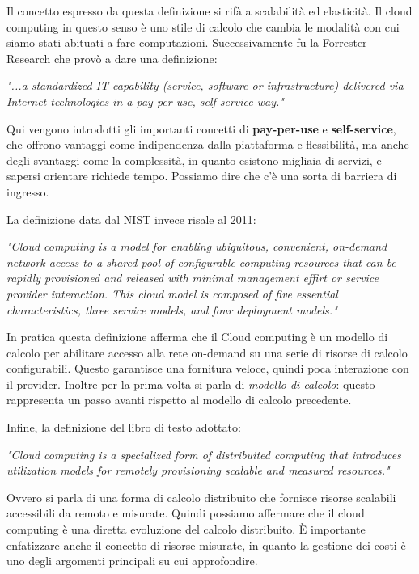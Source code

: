 Il concetto espresso da questa definizione si rifà a scalabilità ed elasticità. Il cloud computing in questo senso è uno stile di calcolo che cambia le modalità con cui siamo stati abituati a fare computazioni.
Successivamente fu la Forrester Research che provò a dare una definizione:
\begin{displayquote}
\textit{"...a standardized IT capability (service, software or infrastructure) delivered via Internet technologies in a pay-per-use, self-service way."}
\end{displayquote}
Qui vengono introdotti gli importanti concetti di \textbf{pay-per-use} e \textbf{self-service}, che offrono vantaggi come indipendenza dalla piattaforma e flessibilità, ma anche degli svantaggi come la complessità, in quanto esistono migliaia di servizi, e sapersi orientare richiede tempo. Possiamo dire che c'è una sorta di barriera di ingresso.

\vspace{5mm}

La definizione data dal NIST invece risale al 2011:
\begin{displayquote}
\textit{"Cloud computing is a model for enabling ubiquitous, convenient, on-demand network access to a shared pool of configurable computing resources that can be rapidly provisioned and released with minimal management effirt or service provider interaction. This cloud model is composed of five essential characteristics, three service models, and four deployment models."}
\end{displayquote}
In pratica questa definizione afferma che il Cloud computing è un modello di calcolo per abilitare accesso alla rete on-demand su una serie di risorse di calcolo configurabili. Questo garantisce una fornitura veloce, quindi poca interazione con il provider. Inoltre per la prima volta si parla di \textit{modello di calcolo}: questo rappresenta un passo avanti rispetto al modello di calcolo precedente.

Infine, la definizione del libro di testo adottato:
\begin{displayquote}
\textit{"Cloud computing is a specialized form of distribuited computing that introduces utilization models for remotely provisioning scalable and measured resources."}
\end{displayquote}

Ovvero si parla di una forma di calcolo distribuito che fornisce risorse scalabili accessibili da remoto e misurate. Quindi possiamo affermare che il cloud computing è una diretta evoluzione del calcolo distribuito. È importante enfatizzare anche il concetto di risorse misurate, in quanto la gestione dei costi è uno degli argomenti principali su cui approfondire.

